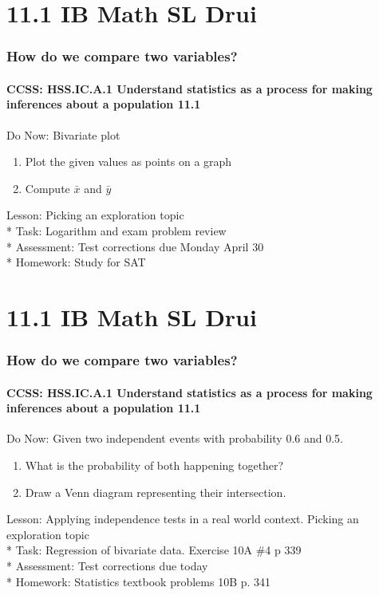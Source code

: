 \documentclass{beamer}
\begin{document}
  \section{11.1 IB Math SL Drui}
  \frame
  {
    \frametitle{How do we compare two variables?}
    \framesubtitle{CCSS: HSS.IC.A.1 Understand statistics as a process for making inferences about a population \qquad \alert{11.1}}

    \begin{block}{Do Now: Bivariate plot}
    \begin{enumerate}
        \item Plot the given values as points on a graph
        \item Compute $\bar{x}$ and $\bar{y}$
    \end{enumerate}
    \end{block}
    Lesson: Picking an exploration topic\\*
    Task: Logarithm and exam problem review\\*
    Assessment: Test corrections due Monday April 30\\*
    Homework: Study for SAT\\
  }

  \section{11.1 IB Math SL Drui}
  \frame
  {
    \frametitle{How do we compare two variables?}
    \framesubtitle{CCSS: HSS.IC.A.1 Understand statistics as a process for making inferences about a population \qquad \alert{11.1}}

    \begin{block}{Do Now: Given two independent events with probability 0.6 and 0.5. }
    \begin{enumerate}
        \item What is the probability of both happening together?
        \item Draw a Venn diagram representing their intersection.
    \end{enumerate}
    \end{block}
    Lesson: Applying independence tests in a real world context. Picking an exploration topic\\*
    Task: Regression of bivariate data. Exercise 10A \#4 p 339\\*
    Assessment: Test corrections due today\\*
    Homework: Statistics textbook problems 10B p. 341\\
  }
\end{document}
